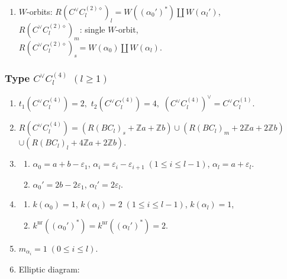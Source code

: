 \documentclass[11pt]{amsart}
\newcommand{\Z}{\mathbb{Z}}
\newcommand{\nr}{\mathrm{nr}}
\newcommand{\vep}{\varepsilon}
\begin{document}
{\begin{enumerate}
\begin{center}
{}
\end{center}
\item $W$-orbits: $R(C^\vee C_l^{(2)\diamond})_l=W((\alpha_0')^\ast) \amalg W(\alpha_l')$, \\
\phantom{$W$-orbits:}
$R(C^\vee C_l^{(2)\diamond})_m$: single $W$-orbit, \\
\phantom{$W$-orbits:}
$R(C^\vee C_l^{(2)\diamond})_s=W(\alpha_0) \amalg W(\alpha_l)$.
\end{enumerate}




\subsubsection{Type $C^\vee C_l^{(4)}$ $(l\geq 1)$}\label{data:CC-12}
\begin{enumerate}
\item $t_1(C^\vee C_l^{(4)})=2,$ \quad $t_2(C^\vee C_l^{(4)})=4,$ \quad $(C^\vee C_l^{(4)})^\vee = C^\vee C_l^{(1)}.$
\item $R(C^\vee C_l^{(4)})=(R(BC_l)_s+\Z a+\Z b) \cup (R(BC_l)_m+2\Z a+2\Z b)$ \\
 $\cup (R(BC_l)_l+4\Z a+2\Z b)$. 
\item 
\begin{enumerate}
\item[i)] $\alpha_0=a+b-\vep_1$,  \; $\alpha_i=\vep_i-\vep_{i+1}\; 
(1\leq i \leq l-1)$, $\alpha_l= a+\vep_l$. 
\item[ii)] $\alpha_0'=2b-2\vep_1$, \; $\alpha_l'=2\vep_l$.
\end{enumerate}
\item 
\begin{enumerate}
\item[i)] $k(\alpha_0)=1$, \; $k(\alpha_i)=2\; 
(1\leq i \leq l-1)$, \; $k(\alpha_l)=1$, 
\item[ii)] $k^{\nr}((\alpha_0')^\ast)=k^{\nr}((\alpha_l')^\ast)=2$. 
\end{enumerate}
\item $m_{\alpha_i}=1\; (0 \leq i \leq l)$. 
\item Elliptic diagram: 





\end{enumerate}}
\end{document}
